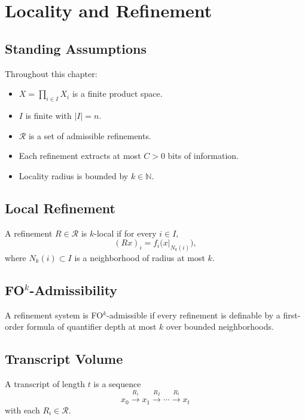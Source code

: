 \chapter{Locality and Refinement}

\section*{Standing Assumptions}

Throughout this chapter:

\begin{itemize}
\item $X = \prod_{i\in I} X_i$ is a finite product space.
\item $I$ is finite with $|I| = n$.
\item $\mathcal{R}$ is a set of admissible refinements.
\item Each refinement extracts at most $C>0$ bits of information.
\item Locality radius is bounded by $k \in \mathbb{N}$.
\end{itemize}

\section{Local Refinement}

\begin{definition}
A refinement $R \in \mathcal{R}$ is $k$-local if for every $i \in I$,
\[
{(Rx)}_i = f_i\bigl(x|_{N_k(i)}\bigr),
\]
where $N_k(i) \subset I$ is a neighborhood of radius at most $k$.
\end{definition}

\section{FO$^k$-Admissibility}

\begin{definition}
A refinement system is FO$^k$-admissible if every refinement is definable by a first-order formula of quantifier depth at most $k$ over bounded neighborhoods.
\end{definition}

\section{Transcript Volume}

\begin{definition}[Transcript]
A transcript of length $t$ is a sequence
\[
x_0 \xrightarrow{R_1} x_1 \xrightarrow{R_2} \cdots \xrightarrow{R_t} x_t
\]
with each $R_i \in \mathcal{R}$.
\end{definition}

